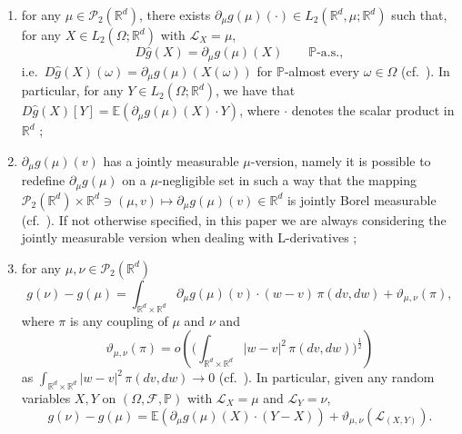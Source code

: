 \documentclass[10pt, a4paper]{article} %
\newcommand{\R}{\mathbb{R}}
\newcommand{\E}{\mathbb{E}}
\theoremstyle{definition}
\theoremstyle{plain}
\begin{document}
    \begin{enumerate}\renewcommand{\labelenumi}{(\roman{enumi})}
        \item for any $\mu \in \mathcal{P}_2(\R^d)$, there exists $\partial_\mu g(\mu)(\cdot) \in L_2(\R^d,\mu;\R^d)$ such that, for any $X \in L_2(\Omega;\R^d)$ with $\mathcal{L}_X=\mu$, 
            \begin{equation*}
                D\hat{g}(X) = \partial_\mu g (\mu) (X) \qquad \text{$\mathbb{P}$-a.s.}, 
            \end{equation*}
        i.e.\ $D\hat{g}(X)(\omega) = \partial_\mu g (\mu) (X(\omega))$ for $\mathbb{P}$-almost every $\omega \in \Omega$ (cf.\ \cite[Proposition 5.25]{CARMONADELARUE_volumeI}). In particular, for any $Y \in L_2(\Omega;\R^d)$, we have that $D\hat{g}(X)[Y] = \E(\partial_\mu g(\mu)(X) \cdot Y)$, where $\cdot$ denotes the scalar product in $\R^d$  ;
        \item $\partial_\mu g(\mu)(v)$ has a jointly measurable $\mu$-version, namely it is possible to redefine $\partial_\mu g(\mu)$ on a $\mu$-negligible set in such a way that the mapping $\mathcal{P}_2(\R^d) \times \R^d \ni (\mu,v) \mapsto \partial_\mu g(\mu) (v) \in \R^d$ is jointly Borel measurable (cf.\ \cite[Proposition 5.33]{CARMONADELARUE_volumeI}). If not otherwise specified, in this paper we are always considering the jointly measurable version when dealing with L-derivatives ;
        \item for any $\mu,\nu \in \mathcal{P}_2(\R^d)$ \begin{equation*}
            g(\nu) - g(\mu) = \int_{\R^d \times \R^d} \partial_\mu g (\mu) (v) \cdot (w-v) \, \pi(dv,dw) + \vartheta_{\mu,\nu}(\pi) ,
        \end{equation*}
        where $\pi$ is any coupling of $\mu$ and $\nu$ and $$\vartheta_{\mu,\nu}(\pi) = o\left( \Big(\int_{\R^d \times \R^d} |w-v|^2 \, \pi(dv,dw) \Big)^\frac{1}{2}\right)$$ as $\int_{\R^d \times \R^d} |w-v|^2 \, \pi(dv,dw) \to 0$ (cf.\ \cite[Lemma 5.30]{CARMONADELARUE_volumeI}). In particular, given any random variables $X,Y$ on $(\Omega,\mathcal{F},\mathbb{P})$ with $\mathcal{L}_X=\mu$ and $\mathcal{L}_Y=\nu$, \begin{equation*}
            g(\nu) - g(\mu) = \E(\partial_\mu g(\mu) (X) \cdot (Y-X)) + \vartheta_{\mu,\nu}(\mathcal{L}_{(X,Y)}). 
        \end{equation*}  
    \end{enumerate} 
\end{document}
